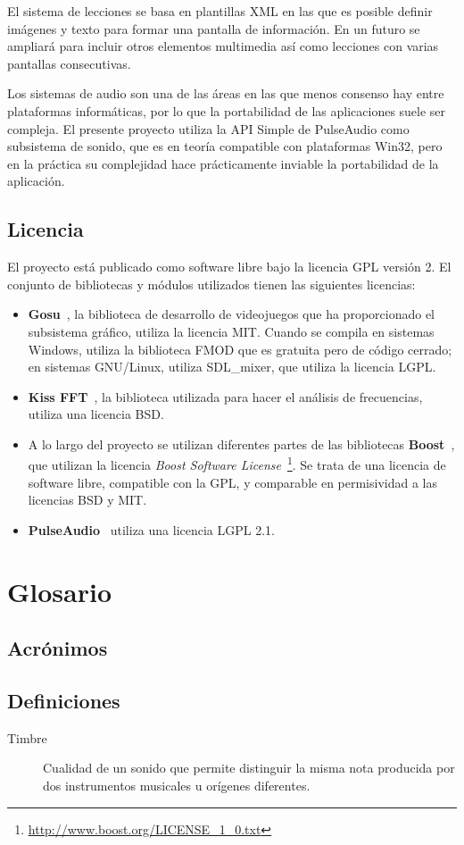 El sistema de lecciones se basa en plantillas XML en las que es
posible definir imágenes y texto para formar una pantalla
de información. En un futuro se ampliará para incluir otros elementos
multimedia así como lecciones con varias pantallas consecutivas.

Los sistemas de audio son una de las áreas en las que menos consenso
hay entre plataformas informáticas, por lo que la portabilidad de las
aplicaciones suele ser compleja. El presente proyecto utiliza la API
Simple de PulseAudio como subsistema de sonido, que es en teoría
compatible con plataformas Win32, pero en la práctica su complejidad
hace prácticamente inviable la portabilidad de la aplicación.

\subsection{Licencia}
El proyecto está publicado como software libre bajo la licencia
\ac{GPL} versión 2. El conjunto de bibliotecas y módulos utilizados
tienen las siguientes licencias:
\begin{itemize}
\item \textbf{Gosu}~\cite{gosu}, la biblioteca de desarrollo de
  videojuegos que ha proporcionado el subsistema gráfico, utiliza la
  licencia \ac{MIT}. Cuando se compila en sistemas Windows, utiliza la
  biblioteca FMOD que es gratuita pero de código cerrado; en sistemas
  GNU/Linux, utiliza SDL\_mixer, que utiliza la licencia \ac{LGPL}.
\item \textbf{Kiss FFT}~\cite{kissfft}, la biblioteca utilizada para
  hacer el análisis de frecuencias, utiliza una licencia \ac{BSD}.
\item A lo largo del proyecto se utilizan diferentes partes de las
  bibliotecas \textbf{Boost}~\cite{boost}, que utilizan la licencia
  \textit{Boost Software License}~\footnote{\url{http://www.boost.org/LICENSE_1_0.txt}}.
  Se trata de una licencia de software libre, compatible con la GPL, y
  comparable en permisividad a las licencias BSD y MIT.
\item \textbf{PulseAudio}~\cite{pulseaudio} utiliza una licencia LGPL 2.1.
\end{itemize}

\section{Glosario}

\subsection{Acrónimos}



\subsection{Definiciones}
\begin{description}
\item[Timbre] Cualidad de un sonido que permite distinguir la misma
  nota producida por dos instrumentos musicales u orígenes diferentes.

\end{description}